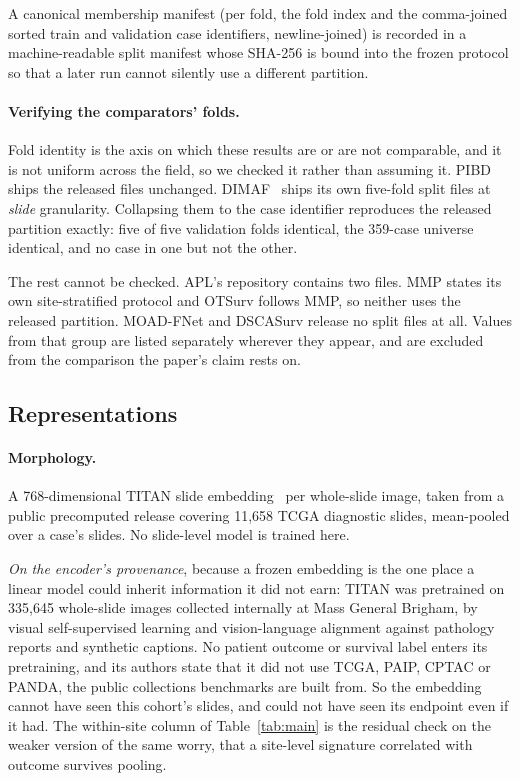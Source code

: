 A canonical membership manifest (per fold, the fold index and the comma-joined sorted train and validation case identifiers, newline-joined) is recorded in
a machine-readable split manifest whose SHA-256 is bound into the frozen protocol so that a
later run cannot silently use a different partition.

\paragraph{Verifying the comparators' folds.} Fold identity is the axis on which these results are
or are not comparable, and it is not uniform across the field, so we checked it rather than assuming
it. PIBD ships the released files unchanged. DIMAF~\citep{eijpe2025dimaf} ships
its own five-fold split files at \emph{slide}
granularity. Collapsing them to the case identifier reproduces the released partition exactly: five of five validation folds identical, the 359-case universe identical, and no case in one but
not the other.

The rest cannot be checked. APL's repository contains two files. MMP states its own site-stratified
protocol and OTSurv follows MMP, so neither uses the released partition. MOAD-FNet and DSCASurv
release no split files at all. Values from that group are listed separately wherever they
appear, and are excluded from the comparison the paper's claim rests on.

\subsection*{Representations}

\paragraph{Morphology.} A 768-dimensional TITAN slide embedding~\citep{ding2025titan} per whole-slide
image, taken from a public precomputed release covering 11{,}658 TCGA diagnostic slides, mean-pooled
over a case's slides. No slide-level model is trained here.

\emph{On the encoder's provenance}, because a frozen embedding is the one place a linear model could
inherit information it did not earn: TITAN was pretrained on 335{,}645 whole-slide images collected
internally at Mass General Brigham, by visual self-supervised learning and vision-language alignment
against pathology reports and synthetic captions. No patient outcome or survival label
enters its pretraining, and its authors state that it did not use TCGA, PAIP, CPTAC or PANDA, the
public collections benchmarks are built from. So the embedding cannot have seen this cohort's
slides, and could not have seen its endpoint even if it had. The within-site column of
Table~\ref{tab:main} is the residual check on the weaker version of the same worry, that a
site-level signature correlated with outcome survives pooling.

